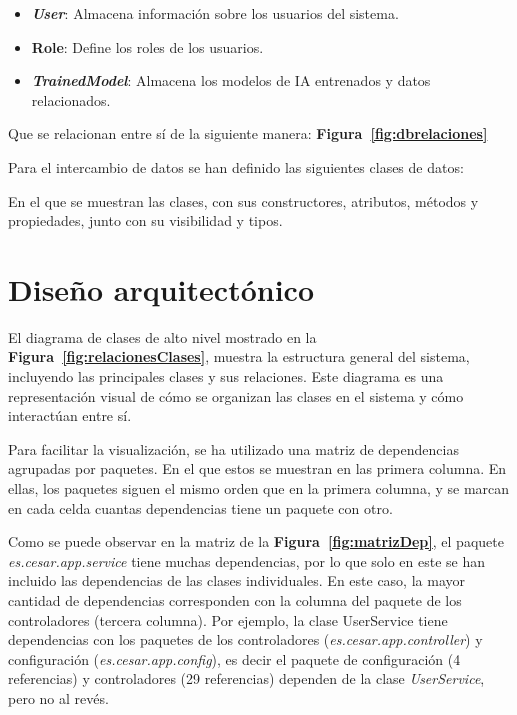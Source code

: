 \begin{itemize}
    \item \textbf{\textit{User}}: Almacena información sobre los usuarios del sistema.
    \item \textbf{Role}: Define los roles de los usuarios.
    \item \textbf{\textit{TrainedModel}}: Almacena los modelos de IA entrenados y datos relacionados.
\end{itemize}
Que se relacionan entre sí de la siguiente manera: \textbf{Figura~\ref{fig:dbrelaciones}}

Para el intercambio de datos se han definido las siguientes clases de datos:

En el que se muestran las clases, con sus constructores, atributos, métodos y propiedades, junto con su visibilidad y tipos.

\section{Diseño arquitectónico}

El diagrama de clases de alto nivel mostrado en la \textbf{Figura~\ref{fig:relacionesClases}}, muestra la estructura general del sistema, incluyendo las principales clases y sus relaciones. Este diagrama es una representación visual de cómo se organizan las clases en el sistema y cómo interactúan entre sí.



Para facilitar la visualización, se ha utilizado una matriz de dependencias agrupadas por paquetes. En el que estos se muestran en las primera columna. 
En ellas, los paquetes siguen el mismo orden que en la primera columna, y se marcan en cada celda cuantas dependencias tiene un paquete con otro.

Como se puede observar en la matriz de la \textbf{Figura~\ref{fig:matrizDep}}, el paquete \textit{es.cesar.app.service} tiene muchas dependencias, por lo que solo en este se han incluido las dependencias de las clases individuales. En este caso, la mayor cantidad de dependencias corresponden con la columna del paquete de los controladores (tercera columna). Por ejemplo, la clase UserService tiene dependencias con los paquetes de los controladores (\textit{es.cesar.app.controller}) y configuración (\textit{es.cesar.app.config}), es decir el paquete de configuración (4 referencias) y controladores (29 referencias) dependen de la clase \textit{UserService}, pero no al revés.

